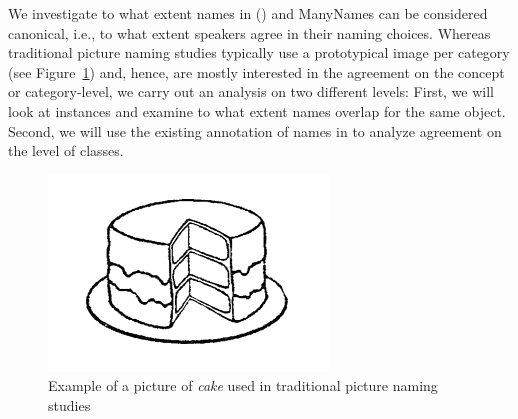 %

We investigate to what extent names in \vg (\vg) and ManyNames can be considered canonical, i.e., to what extent speakers agree in their naming choices.
Whereas traditional picture naming studies typically use a prototypical image per category (see Figure~\ref{fig:picture_naming}) and, hence, are mostly interested in the agreement on the concept or category-level, we carry out an analysis on two different levels: First, we will look at instances and examine to what extent names overlap for the same object. 
Second, we will use the existing annotation of names in \vg to analyze agreement on the level of classes.
\begin{figure}[t]
	\centering
	\includegraphics[scale=.5]{figures/snodgrass_vanderwart_cake_042.png}
	\caption{Example of a picture of \textsl{cake} used in traditional picture naming studies \cite{snodgrass} \label{fig:picture_naming}}
\end{figure}

